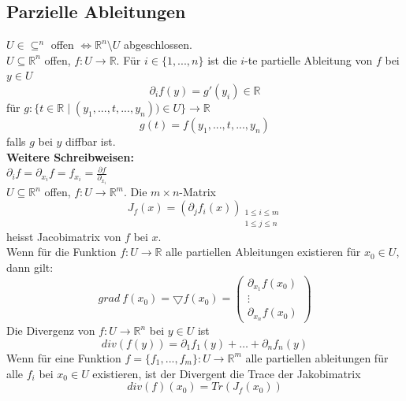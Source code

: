 \subsection{Parzielle Ableitungen}
    $U\in\subseteq^n$ offen $\iff \mathbb R^n\setminus U$ abgeschlossen.\\
    $U\subseteq\mathbb R^n$ offen, $f:U\rightarrow\mathbb R$. Für
    $i\in\{1,...,n\}$ ist die $i$-te partielle Ableitung von $f$ bei $y\in U$
    $$\partial_if(y)=g'(y_i)\in\mathbb R$$ für $g:\{t\in\mathbb
    R\mid(y_1,...,t,...,y_n))\in U\}\rightarrow\mathbb R$
    $$g(t)=f(y_1,...,t,...,y_n)$$ falls $g$ bei $y$ diffbar ist.\\
    \textbf{Weitere Schreibweisen:}\\
    $\partial_if=\partial_{x_i}f=f_{x_i}=\frac{\partial f}{\partial_{x_i}}$\\
    $U\subseteq\mathbb R^n$ offen, $f:U\rightarrow\mathbb R^m$. Die $m\times
    n$-Matrix $$J_f(x)=(\partial_jf_i(x))_{\substack{1\leq i\leq m\\1\leq j\leq
    n}}$$
    heisst Jacobimatrix von $f$ bei $x$.\\
  Wenn für die Funktion $f:U\rightarrow \mathbb R$ alle partiellen Ableitungen existieren für $x_0\in U$, dann gilt: $$grad\ f(x_0) = \bigtriangledown f(x_0)= \begin{pmatrix}\partial_{x_1}f(x_0)\\\vdots\\\partial_{x_n}f(x_0)\end{pmatrix}$$
  Die Divergenz von $f: U\rightarrow \mathbb{R}^n$ bei $y\in U$ ist $$div(f(y))=\partial_1 f_1(y) + \dots + \partial_n f_n(y)$$
  Wenn für eine Funktion $f=\{f_1,...,f_m\}:U\rightarrow\mathbb R^m$ alle partiellen ableitungen für alle $f_i$ bei $x_0\in U$ existieren, ist der Divergent die Trace der Jakobimatrix $$div(f)(x_0)=Tr(J_f(x_0))$$
